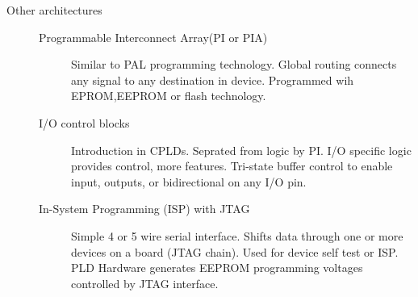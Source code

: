 \begin{description}
\item [Other architectures]

    \begin{description}
    \item [Programmable Interconnect Array(PI or PIA)] Similar to PAL programming technology. Global routing connects any signal to any destination in device. Programmed wih EPROM,EEPROM or flash technology.

    \item [I/O control blocks] Introduction in CPLDs. Seprated from logic by PI. I/O specific logic provides control, more features. Tri-state buffer control to enable input, outputs, or bidirectional on any I/O pin.

    \item [In-System Programming (ISP) with JTAG] Simple 4 or 5 wire serial interface. Shifts data through one or more devices on a board (JTAG chain). Used for device self test or ISP.
PLD Hardware generates EEPROM programming voltages controlled by JTAG interface.

    \end{description}


\end{description}
